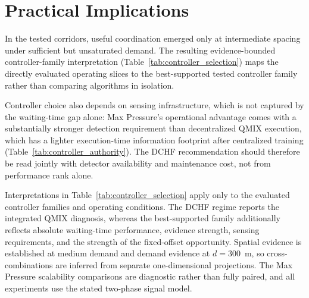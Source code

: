 \documentclass[review,12pt]{elsarticle}
\begin{document}
\section{Practical Implications}
\label{sec:implications}

In the tested corridors, useful coordination emerged only at intermediate spacing under sufficient but unsaturated demand. The resulting evidence-bounded controller-family interpretation (Table~\ref{tab:controller_selection}) maps the directly evaluated operating slices to the best-supported tested controller family rather than comparing algorithms in isolation.

Controller choice also depends on sensing infrastructure, which is not captured by the waiting-time gap alone: Max Pressure's operational advantage comes with a substantially stronger detection requirement than decentralized QMIX execution, which has a lighter execution-time information footprint after centralized training (Table~\ref{tab:controller_authority}). The DCHF recommendation should therefore be read jointly with detector availability and maintenance cost, not from performance rank alone.

Interpretations in Table~\ref{tab:controller_selection} apply only
to the evaluated controller families and operating conditions. The DCHF
regime reports the integrated QMIX diagnosis, whereas the best-supported
family additionally reflects absolute waiting-time performance, evidence
strength, sensing requirements, and the strength of the fixed-offset
opportunity. Spatial evidence is established at medium demand and demand
evidence at $d=300$~m, so cross-combinations are inferred from separate
one-dimensional projections. The Max Pressure scalability comparisons are
diagnostic rather than fully paired, and all experiments use the stated
two-phase signal model.
\end{document}
